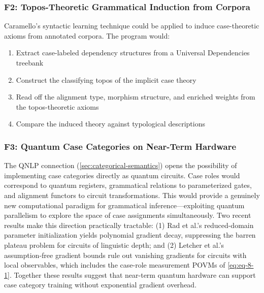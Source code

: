 \documentclass[
]{article}
\providecommand{\tightlist}{%
  \setlength{\itemsep}{0pt}\setlength{\parskip}{0pt}}
\begin{document}
\subsubsection{F2: Topos-Theoretic Grammatical Induction from
Corpora}\label{f2-topos-theoretic-grammatical-induction-from-corpora}

Caramello's \citeyearpar{caramello2023syntactic} syntactic learning
technique could be applied to induce case-theoretic axioms from
annotated corpora. The program would:

\begin{enumerate}
\def\labelenumi{\arabic{enumi}.}
\tightlist
\item
  Extract case-labeled dependency structures from a Universal
  Dependencies treebank
\item
  Construct the classifying topos of the implicit case theory
\item
  Read off the alignment type, morphism structure, and enriched weights
  from the topos-theoretic axioms
\item
  Compare the induced theory against typological descriptions
\end{enumerate}

\subsubsection{F3: Quantum Case Categories on Near-Term
Hardware}\label{f3-quantum-case-categories-on-near-term-hardware}

The QNLP connection (\autoref{sec:categorical-semantics}) opens the
possibility of implementing case categories directly as quantum
circuits. Case roles would correspond to quantum registers, grammatical
relations to parameterized gates, and alignment functors to circuit
transformations. This would provide a genuinely new computational
paradigm for grammatical inference---exploiting quantum parallelism to
explore the space of case assignments simultaneously. Two recent results
make this direction practically tractable: (1) Rad et al.'s
\citeyearpar{rad2024trainability} reduced-domain parameter
initialization yields polynomial gradient decay, suppressing the barren
plateau problem for circuits of linguistic depth; and (2) Letcher et
al.'s \citeyearpar{letcher2024tight} assumption-free gradient bounds
rule out vanishing gradients for circuits with local observables, which
includes the case-role measurement POVMs of \autoref{eq:eq-8-1}.
Together these results suggest that near-term quantum hardware can
support case category training without exponential gradient overhead.
\end{document}
